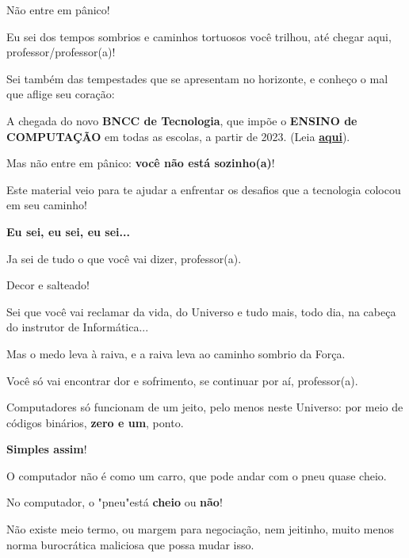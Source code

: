 
\begin{multicols}{2}
\huge Não entre em pânico!

\vfill\null
\pagebreak
 
\normalsize

Eu sei dos tempos sombrios e caminhos tortuosos você trilhou, até chegar aqui, professor/professor(a)!

Sei também das tempestades que se apresentam no horizonte, e conheço o mal que aflige seu coração:

A chegada do novo \textbf{BNCC de Tecnologia}, que impõe o \textbf{ENSINO de COMPUTAÇÃO} em todas as escolas, a partir de 2023. (Leia \href{http://portal.mec.gov.br/index.php?option=com_docman&view=download&alias=241671-rceb001-22&category_slug=outubro-2022-pdf&Itemid=30192}{\textbf{aqui}}).

\vfill\null
\columnbreak

Mas não entre em pânico: \textbf{você não está sozinho(a)}!

Este material veio para te ajudar a enfrentar os desafios que a tecnologia colocou em seu caminho!

\textbf{Eu sei, eu sei, eu sei...}

Ja sei de tudo o que você vai dizer, professor(a).

Decor e salteado!

Sei que você vai reclamar da vida, do Universo e tudo mais, todo dia, na cabeça do instrutor de Informática... 

Mas o medo leva à raiva, e a raiva leva ao caminho sombrio da Força.

Você só vai encontrar dor e sofrimento, se continuar por aí, professor(a).

Computadores só funcionam de um jeito, pelo menos neste Universo:  por meio de códigos binários, \textbf{zero e um}, ponto.

\textbf{Simples assim}!


O computador não é como um carro, que pode andar com o pneu quase cheio.

No computador, o "pneu"\space está \textbf{cheio} ou \textbf{não}!

Não existe meio termo, ou margem para negociação, nem jeitinho, muito menos norma burocrática maliciosa que possa mudar isso.


\end{multicols}
